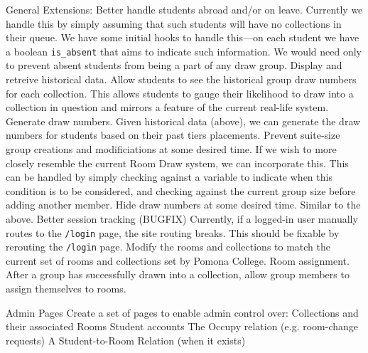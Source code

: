 \begin{outline}
\1 General Extensions:
  \2 Better handle students abroad and/or on leave.
    \3 Currently we handle this by simply assuming that such students will have
    no collections in their queue. We have some initial hooks to handle
    this---on each student we have a boolean \texttt{is\_absent} that aims
    to indicate such information. We would need only to prevent absent students
    from being a part of any draw group.
  \2 Display and retreive historical data.
    \3 Allow students to see the historical group draw numbers for each
    collection. This allows students to gauge their likelihood to draw into a
    collection in question and mirrors a feature of the current real-life
    system.
  \2 Generate draw numbers.
    \3 Given historical data (above), we can generate the draw numbers for
    students based on their past tiers placements.
  \2 Prevent suite-size group creations and modificiations at some desired time.
    \3 If we wish to more closely resemble the current Room Draw system, we can
    incorporate this. This can be handled by simply checking against a variable
    to indicate when this condition is to be considered, and checking against
    the current group size before adding another member.
  \2 Hide draw numbers at some desired time.
    \3 Similar to the above.
  \2 Better session tracking (BUGFIX)
    \3 Currently, if a logged-in user manually routes to the \texttt{/login}
    page, the site routing breaks. This should be fixable by rerouting the
    \texttt{/login} page.
  \2 Modify the rooms and collections to match the current set of rooms and
  collections set by Pomona College.
  \2 Room assignment.
    \3 After a group has successfully drawn into a collection, allow group
    members to assign themselves to rooms.

\1 Admin Pages
  \2 Create a set of pages to enable admin control over:
    \3 Collections and their associated Rooms
    \3 Student accounts
    \3 The Occupy relation (e.g. room-change requests)
    \3 A Student-to-Room Relation (when it exists)


\end{outline}
